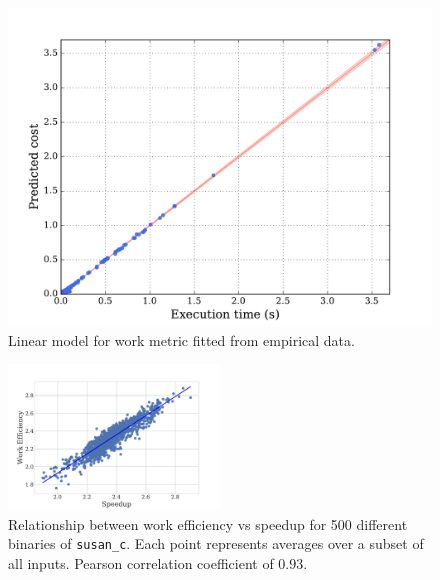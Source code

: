    \begin{figure}[t]
        \centering
        \includegraphics[width=0.6\linewidth]{figs/cost-model.pdf}
        \caption{
            Linear model for work metric fitted from empirical data.
        }
        \label{fig:cost-model}
    \end{figure}

    \begin{figure}[t]
        \centering
        \includegraphics[width=0.5\textwidth]{figs/motivation-work-efficiency.pdf}
        \caption{Relationship between work efficiency vs speedup for 500 different binaries of \texttt{susan\_c}.
                Each point represents averages over a subset of all inputs.
                Pearson correlation coefficient of $0.93$.}
        \label{fig:motivation-work-efficiency}
    \end{figure}
